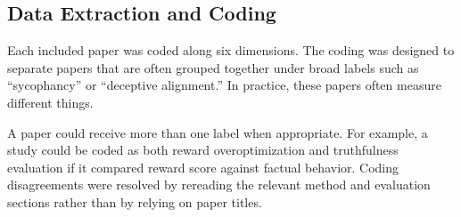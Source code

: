 \documentclass[letterpaper]{article} %
\begin{document}
\subsection{Data Extraction and Coding}

Each included paper was coded along six dimensions. The coding was designed to separate papers that are often grouped together under broad labels such as ``sycophancy'' or ``deceptive alignment.'' In practice, these papers often measure different things.

\begin{table}[t]
\centering
\caption{Coding dimensions used for the 48 included papers.}
\label{tab:coding}
\renewcommand{\arraystretch}{1.15}
\end{table}

A paper could receive more than one label when appropriate. For example, a study could be coded as both reward overoptimization and truthfulness evaluation if it compared reward score against factual behavior. Coding disagreements were resolved by rereading the relevant method and evaluation sections rather than by relying on paper titles.
\end{document}
